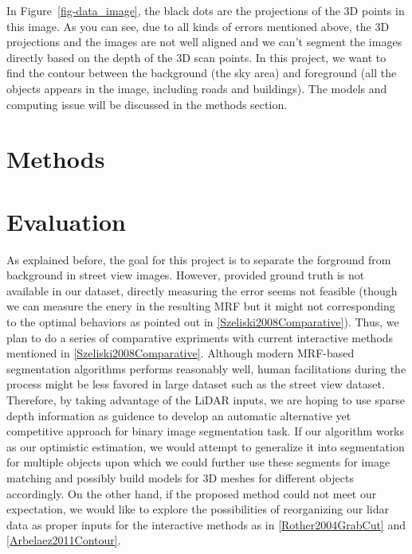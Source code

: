 \documentclass{article} %
\begin{document}
In Figure~\ref{fig-data_image}, the black dots are the projections of
the 3D points in this image. As you can see, due to all kinds of
errors mentioned above, the 3D projections and the images are not well
aligned and we can't segment the images directly based on the depth of
the 3D scan points. In this project, we want to find the contour
between the background (the sky area) and foreground (all the objects
appears in the image, including roads and buildings). The models and
computing issue will be discussed in the methods section.

\section{Methods}

\section{Evaluation}
As explained before, the goal for this project is to separate the forground from background in street view images. However, provided ground truth is not available in our dataset, directly measuring the error seems not feasible (though we can measure the enery in the resulting MRF but it might not corresponding to the optimal behaviors as pointed out in \ref{Szeliski2008Comparative}). Thus, we plan to do a series of comparative expriments with current interactive methods mentioned in \ref{Szeliski2008Comparative}. Although modern MRF-based segmentation algorithms performs reasonably well, human facilitations during the process might be less favored in large dataset such as the street view dataset. Therefore,  by taking advantage of the LiDAR inputs, we are hoping to use sparse depth information as guidence to develop an automatic alternative yet competitive approach for binary image segmentation task. If our algorithm works as our optimistic estimation, we would attempt to generalize it into segmentation for multiple objects upon which we could further use these segments for image matching and possibly build models for 3D meshes for different objects accordingly. On the other hand, if the proposed method could not meet our expectation, we would like to explore the possibilities of reorganizing our lidar data as proper inputs for the interactive methods as in \ref{Rother2004GrabCut} and \ref{Arbelaez2011Contour}.



\end{document}
